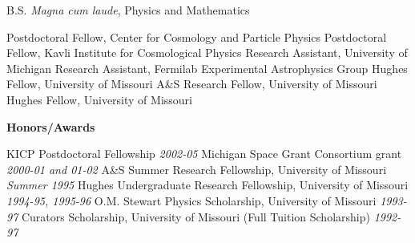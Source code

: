 \tsp
\noindent
\makebox[1.25in][l]{}
\parbox{5.40in}{B.S. {\it Magna cum laude}, Physics and Mathematics}

%
%

\ssp
\ssp
\noindent
{}
	{Postdoctoral Fellow, Center for Cosmology and Particle Physics}
        \newline
{}
        \hfill
\newline
\makebox[1.25in][l]{}
	{Postdoctoral Fellow, Kavli Institute for Cosmological Physics}
	\newline
{}
	\hfill
\newline
\makebox[1.25in][l]{}
	{{Research Assistant, University of Michigan}}
	\hfill
\newline
\makebox[1.25in][l]{}
	{Research Assistant, Fermilab Experimental Astrophysics Group}
	\hfill
{}
\newline
\makebox[1.25in][l]{}
	{Hughes Fellow, University of Missouri}
	\hfill
\newline
\makebox[1.25in][l]{}
	{A\&S Research Fellow, University of Missouri}
	\hfill
\newline
\makebox[1.25in][l]{}
	{Hughes Fellow, University of Missouri}
	\hfill

\ssp
\ssp
\noindent
\parbox[l]{1.25in}{{\bf Honors/Awards}}
\parbox[t]{5.40in}{
KICP Postdoctoral Fellowship \hfill {\small \it 2002-05} \newline
Michigan Space Grant Consortium grant  \hfill 
       {\small \it 2000-01 and 01-02 }\newline
A\&S Summer Research Fellowship, University of Missouri \hfill 
       {\small \it Summer 1995}\newline
Hughes Undergraduate Research Fellowship, University of
       Missouri  \hfill {\small \it 1994-95, 1995-96}\newline
O.M. Stewart Physics Scholarship, University
       of Missouri \hfill {\small \it 1993-97}\newline
Curators Scholarship, University of Missouri 
       (Full Tuition Scholarship) \hfill {\small \it 1992-97}
}

